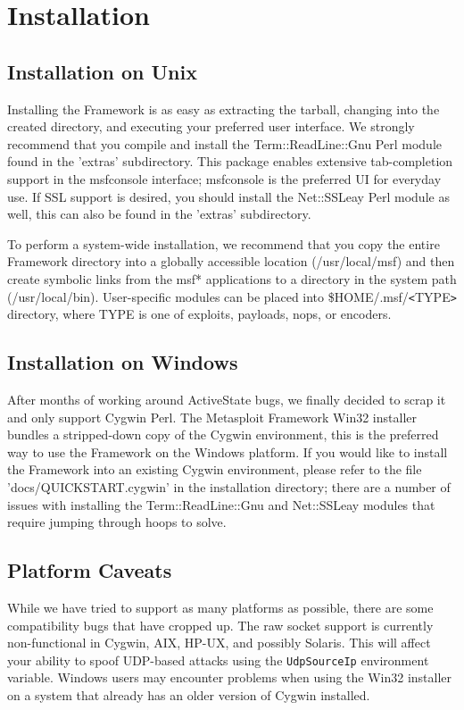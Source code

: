 \documentclass{report}
\begin{document}
\par
\pagebreak

\chapter{Installation}

    \section{Installation on Unix}
    \label{INSTALL-UNIX}
\par
Installing the Framework is as easy as extracting the tarball, changing into the
created directory, and executing your preferred user interface. We strongly
recommend that you compile and install the Term::ReadLine::Gnu Perl module found
in the 'extras' subdirectory. This package enables extensive tab-completion
support in the msfconsole interface; msfconsole is the preferred UI for everyday
use.  If SSL support is desired, you should install the Net::SSLeay Perl module
as well, this can also be found in the 'extras' subdirectory.  

\par
To perform a system-wide installation, we recommend that you copy the entire
Framework directory into a globally accessible location (/usr/local/msf) and
then create symbolic links from the msf* applications to a directory in the
system path (/usr/local/bin). User-specific modules can be placed into
\$HOME/.msf/\verb#<#TYPE\verb#># directory, where TYPE is one of exploits, payloads, nops, or
encoders. 

    \section{Installation on Windows}
    \label{INSTALL-WIN32}
\par
After months of working around ActiveState bugs, we finally decided to scrap it
and only support Cygwin Perl. The Metasploit Framework Win32 installer bundles a
stripped-down copy of the Cygwin environment, this is the preferred way to use
the Framework on the Windows platform. If you would like to install the
Framework into an existing Cygwin environment, please refer to the file
'docs/QUICKSTART.cygwin' in the installation directory; there are a number of
issues with installing the Term::ReadLine::Gnu and Net::SSLeay modules that
require jumping through hoops to solve.  
   
    \section{Platform Caveats}
    \label{INSTALL-CAVEAT}
\par
While we have tried to support as many platforms as possible, there are some
compatibility bugs that have cropped up. The raw socket support is currently
non-functional in Cygwin, AIX, HP-UX, and possibly Solaris. This will affect
your ability to spoof UDP-based attacks using the \texttt{UdpSourceIp}
environment variable. Windows users may encounter problems when using the Win32
installer on a system that already has an older version of Cygwin installed. 
\end{document}
